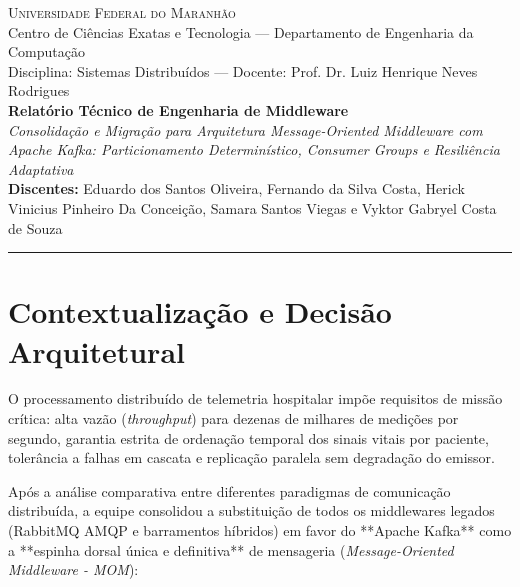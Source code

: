 \documentclass[11pt,a4paper]{article}
\begin{document}
\begin{center}
    {\large \textsc{Universidade Federal do Maranhão}}\\[1pt]
    {\small Centro de Ciências Exatas e Tecnologia --- Departamento de Engenharia da Computação}\\[2pt]
    {\small Disciplina: Sistemas Distribuídos --- Docente: Prof. Dr. Luiz Henrique Neves Rodrigues}\\[8pt]

    {\Large \textbf{Relatório Técnico de Engenharia de Middleware}}\\[3pt]
    {\large \textit{Consolidação e Migração para Arquitetura Message-Oriented Middleware com Apache Kafka: Particionamento Determinístico, Consumer Groups e Resiliência Adaptativa}}\\[6pt]

    \textbf{Discentes:} Eduardo dos Santos Oliveira, Fernando da Silva Costa, Herick Vinicius Pinheiro Da Conceição, Samara Santos Viegas e Vyktor Gabryel Costa de Souza\\[6pt]
    \rule{\linewidth}{1.2pt}
\end{center}

\section{Contextualização e Decisão Arquitetural}

O processamento distribuído de telemetria hospitalar impõe requisitos de missão crítica: alta vazão (\textit{throughput}) para dezenas de milhares de medições por segundo, garantia estrita de ordenação temporal dos sinais vitais por paciente, tolerância a falhas em cascata e replicação paralela sem degradação do emissor.

Após a análise comparativa entre diferentes paradigmas de comunicação distribuída, a equipe consolidou a substituição de todos os middlewares legados (RabbitMQ AMQP e barramentos híbridos) em favor do **Apache Kafka** como a **espinha dorsal única e definitiva** de mensageria (\textit{Message-Oriented Middleware - MOM}):
\end{document}
